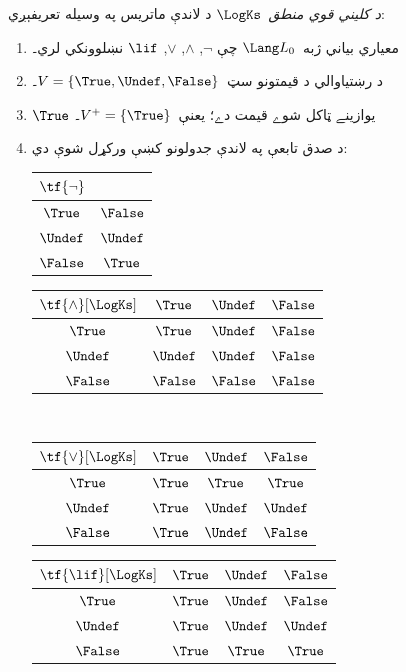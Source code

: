 \documentclass[../../../include/open-logic-section]{subfiles}
\begin{document}
\begin{defn}
\emph{د کليني قوي منطق}~$\LogKs$ د لاندې ماتريس په وسيله تعريفېږي:
\begin{enumerate}
  \item معياري بياني ژبه~$\Lang L_0$ چې
  $\lnot$, $\land$, $\lor$, $\lif$ نښلوونکي لري۔
  \item د رښتياوالي د قيمتونو سټ~$V = \{\True, \Undef, \False\}$۔
  \item $\True$ يوازينے ټاکل شوے قيمت دے؛ يعنې~$V^+ = \{\True\}$۔
  \item د صدق تابعې په لاندې جدولونو کښې ورکړل شوې دي:
  \begin{center}
    \begin{tabular}{c|c} 
      $\tf{\lnot}$ & \\ 
      \hline  
      $\True$ & $\False$ \\ 
      $\Undef$ & $\Undef$ \\
      $\False$ & $\True$ 
    \end{tabular}
    \quad
    \begin{tabular}{c|ccc} 
      $\tf{\land}[\LogKs]$ & $\True$ & $\Undef$ & $\False$ \\ 
      \hline 
      $\True$ & $\True$ & $\Undef$ & $\False$ \\ 
      $\Undef$ & $\Undef$ & $\Undef$ & $\False$\\ 
      $\False$ & $\False$ & $\False$ & $\False$ 
    \end{tabular}
    \\[2ex]
    \begin{tabular}{c|ccc} 
      $\tf{\lor}[\LogKs]$ & $\True$ & $\Undef$ & $\False$ \\ 
      \hline 
      $\True$ & $\True$ & $\True$ & $\True$ \\ 
      $\Undef$ & $\True$ & $\Undef$ & $\Undef$ \\
      $\False$ & $\True$ & $\Undef$ & $\False$ 
    \end{tabular}
    \quad
    \begin{tabular}{c|ccc} 
      $\tf{\lif}[\LogKs]$ & $\True$ & $\Undef$ & $\False$ \\ 
      \hline 
      $\True$ & $\True$ & $\Undef$ & $\False$ \\ 
      $\Undef$ & $\True$ & $\Undef$ & $\Undef$  \\ 
      $\False$ & $\True$ & $\True$ & $\True$ 
    \end{tabular}
  \end{center} 
\end{enumerate}
\end{defn}
\end{document}
